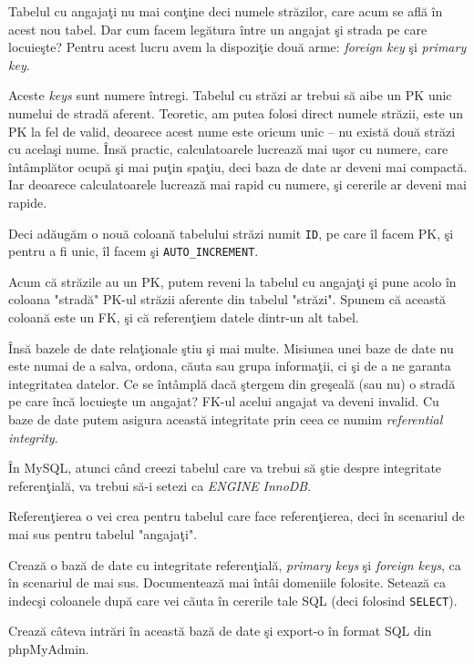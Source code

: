 Tabelul cu angajaţi nu mai conţine deci numele străzilor, care acum se află
în acest nou tabel. Dar cum facem legătura între un angajat şi strada pe care
locuieşte? Pentru acest lucru avem la dispoziţie două arme: \textsl{foreign key}
şi \textsl{primary key}.

Aceste \textit{keys} sunt numere întregi. Tabelul cu străzi ar trebui să aibe
un PK unic numelui de stradă aferent. Teoretic, am putea folosi direct
numele străzii, este un PK la fel de valid, deoarece acest nume este oricum unic --
nu există două străzi cu acelaşi nume. Însă practic, calculatoarele lucrează
mai uşor cu numere, care întâmplător ocupă şi mai puţin spaţiu, deci baza de date
ar deveni mai compactă. Iar deoarece calculatoarele lucrează mai rapid cu numere,
şi cererile ar deveni mai rapide.

Deci adăugăm o nouă coloană tabelului străzi numit \texttt{ID}, pe care îl facem
PK, şi pentru a fi unic, îl facem şi \texttt{AUTO\_INCREMENT}.

Acum că străzile au un PK, putem reveni la tabelul cu angajaţi şi pune acolo
în coloana "stradă" PK-ul străzii aferente din tabelul "străzi". Spunem că
această coloană este un FK, şi că referenţiem datele dintr-un alt tabel.

Însă bazele de date relaţionale ştiu şi mai multe. Misiunea unei baze de date
nu este numai de a salva, ordona, căuta sau grupa informaţii, ci şi de a ne
garanta integritatea datelor. Ce se întâmplă dacă ştergem din greşeală (sau nu)
o stradă pe care încă locuieşte un angajat? FK-ul acelui angajat va deveni
invalid. Cu baze de date putem asigura această integritate prin ceea ce numim
\textsl{referential integrity}.

În MySQL, atunci când creezi tabelul care va trebui să ştie despre integritate
referenţială, va trebui să-i setezi ca \textsl{ENGINE} \textsl{InnoDB}.

Referenţierea o vei crea pentru tabelul care face referenţierea, deci în scenariul
de mai sus pentru tabelul "angajaţi".

\begin{Exercise}
Crează o bază de date cu integritate referenţială, \textit{primary keys} şi
\textit{foreign keys}, ca în scenariul de mai sus. Documentează mai întâi domeniile
folosite. Setează ca indecşi coloanele după care vei căuta în cererile tale
SQL (deci folosind \texttt{SELECT}).

Crează câteva intrări în această bază de date şi export-o în format SQL din phpMyAdmin.
\end{Exercise}

